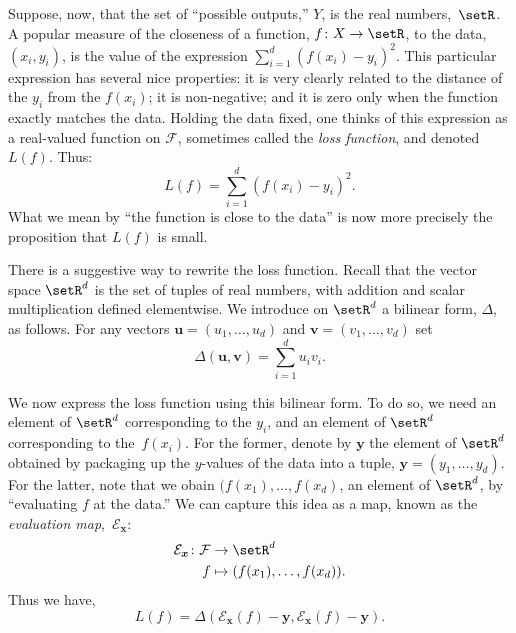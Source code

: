 \documentclass[10pt, a4paper]{article}
\begin{document}
Suppose, now, that the set of “possible outputs,” $Y$, is the real
numbers,~$\setR$. A popular measure of the closeness of a function,
$f\colon X\to\setR$, to the data, $(x_i, y_i)$, is the value of the
expression $\sum_{i=1}^d{(f(x_i) - y_i)}^2$. This particular expression
has several nice properties: it is very clearly related to the
distance of the $y_i$ from the $f(x_i)$; it is non-negative; and it is
zero only when the function exactly matches the data. Holding the data
fixed, one thinks of this expression as a real-valued function on
$\mathcal{F}$, sometimes called the \emph{loss function}, and denoted
$L(f)$. Thus:
\[
L(f) = \sum_{i=1}^d{(f(x_i) - y_i)}^2.
\]
What we mean by “the function is close to the data” is now more
precisely the proposition that $L(f)$ is small.

There is a suggestive way to rewrite the loss function. Recall that
the vector space $\setR^d$ is the set of tuples of real numbers, with
addition and scalar multiplication defined elementwise. We introduce
on $\setR^d$ a bilinear form, $\Delta$, as follows. For any vectors
$\bm{u} = (u_1,\dotsc,u_d)$ and $\bm{v}=(v_1,\dotsc,v_d)$ set
\[
\Delta(\bm{u}, \bm{v}) = \sum_{i=1}^d u_iv_i.
\]

We now express the loss function using this bilinear form. To do so,
we need an element of $\setR^d$ corresponding to the $y_i$, and an
element of $\setR^d$ corresponding to the~$f(x_i)$. For the former,
denote by $\bm{y}$ the element of $\setR^d$ obtained by packaging up
the $y$-values of the data into a tuple, $\bm{y}=(y_1, \dotsc,
y_d)$. For the latter, note that we obain $(f(x_1),\dotsc,f(x_d)$, an
element of $\setR^d$, by “evaluating $f$ at the data.” We can capture
this idea as a map, known as the \emph{evaluation
  map},~$\mathcal{E}_{\bm{x}}$:
\[
  \begin{aligned}
    \mathcal{E}_{\bm{x}} \colon \mathcal{F} &\to \setR^d \\
    f &\mapsto (f(x_1), \dotsc, f(x_d)).
  \end{aligned}
\]
Thus we have,
\[
  L(f) = \Delta(\mathcal{E}_{\bm{x}}(f) - \bm{y}, \mathcal{E}_{\bm{x}}(f) - \bm{y}).
\]
\end{document}
